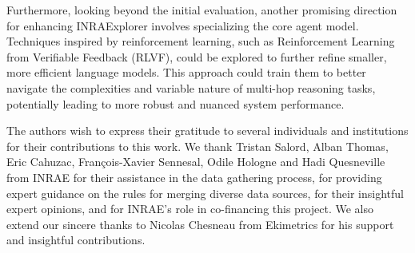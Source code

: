 \documentclass{ecai}
\begin{document}
Furthermore, looking beyond the initial evaluation, another promising direction for enhancing INRAExplorer involves specializing the core agent model. Techniques inspired by reinforcement learning, such as Reinforcement Learning from Verifiable Feedback (RLVF), could be explored to further refine smaller, more efficient language models. This approach could train them to better navigate the complexities and variable nature of multi-hop reasoning tasks, potentially leading to more robust and nuanced system performance.


\begin{ack}
The authors wish to express their gratitude to several individuals and institutions for their contributions to this work. We thank Tristan Salord, Alban Thomas, Eric Cahuzac, François-Xavier Sennesal, Odile Hologne and Hadi Quesneville from INRAE for their assistance in the data gathering process, for providing expert guidance on the rules for merging diverse data sources, for their insightful expert opinions, and for INRAE's role in co-financing this project. We also extend our sincere thanks to Nicolas Chesneau from Ekimetrics for his support and insightful contributions.
\end{ack}



\end{document}
